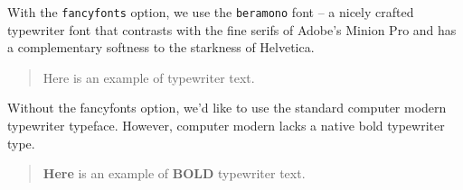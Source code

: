 \documentclass[longtitle,sidenotes,nofancyfonts]{dgleich-article}
\begin{document}
With the \verb#fancyfonts# option, 
we use the \verb#beramono# font -- a nicely crafted typewriter font that contrasts
with the fine serifs of Adobe's Minion Pro and has a complementary softness
to the starkness of Helvetica.  

\begin{quote}
\ttfamily 
Here is an example of typewriter text.
\end{quote}

Without the fancyfonts option, we'd like to use the standard computer modern
typewriter typeface.  However, computer modern lacks a native bold typewriter type.  
\begin{quote}
 \ttfamily
\textbf{Here} is an example of \textbf{BOLD} typewriter text.
\end{quote}
\end{document}
